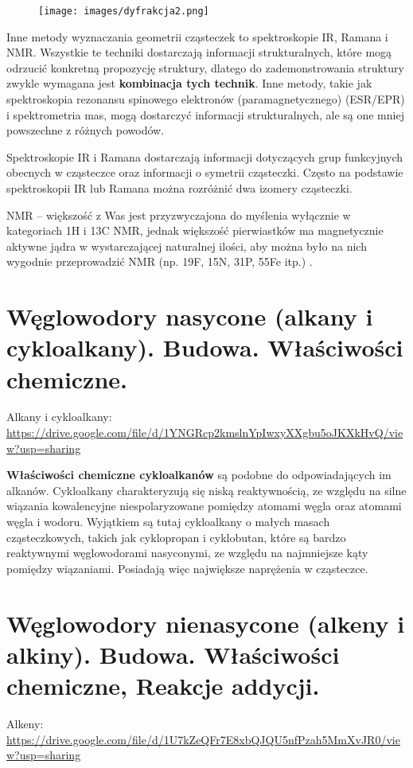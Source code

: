 \documentclass{article}
\begin{document}
\begin{figure}[H]
    \centering
    \texttt{[image: images/dyfrakcja2.png]}
\end{figure}

Inne metody wyznaczania geometrii cząsteczek to spektroskopie IR, Ramana i NMR. Wszystkie te techniki dostarczają informacji strukturalnych, które mogą odrzucić konkretną propozycję struktury, dlatego do zademonstrowania struktury zwykle wymagana jest \textbf{kombinacja tych technik}. Inne metody, takie jak spektroskopia rezonansu spinowego elektronów (paramagnetycznego) (ESR/EPR) i spektrometria mas, mogą dostarczyć informacji strukturalnych, ale są one mniej powszechne z różnych powodów.

Spektroskopie IR i Ramana dostarczają informacji dotyczących grup funkcyjnych obecnych w cząsteczce oraz informacji o symetrii cząsteczki. Często na podstawie spektroskopii IR lub Ramana można rozróżnić dwa izomery cząsteczki.

NMR – większość z Was jest przyzwyczajona do myślenia wyłącznie w kategoriach 1H i 13C NMR, jednak większość pierwiastków ma magnetycznie aktywne jądra w wystarczającej naturalnej ilości, aby można było na nich wygodnie przeprowadzić NMR (np. 19F, 15N, 31P, 55Fe itp.) .

\section{Węglowodory nasycone (alkany i cykloalkany). Budowa. Właściwości chemiczne.}
Alkany i cykloalkany: \url{https://drive.google.com/file/d/1YNGRcp2kmslnYpIwxyXXgbu5oJKXkHvQ/view?usp=sharing}


\textbf{Właściwości chemiczne cykloalkanów} są podobne do odpowiadających im alkanów. Cykloalkany charakteryzują się niską reaktywnością, ze względu na silne wiązania kowalencyjne niespolaryzowane pomiędzy atomami węgla oraz atomami węgla i wodoru. Wyjątkiem są tutaj cykloalkany o małych masach cząsteczkowych, takich jak cyklopropan i cyklobutan, które są bardzo reaktywnymi węglowodorami nasyconymi, ze względu na najmniejsze kąty pomiędzy wiązaniami. Posiadają więc największe naprężenia w cząsteczce.

\section{Węglowodory nienasycone (alkeny i alkiny). Budowa. Właściwości chemiczne, Reakcje addycji.}
Alkeny: \url{https://drive.google.com/file/d/1U7kZeQFr7E8xbQJQU5nfPzah5MmXvJR0/view?usp=sharing}
\end{document}
